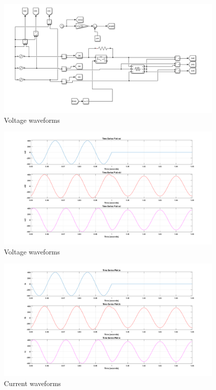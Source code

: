 \documentclass{article}
\begin{document}
\begin{figure}[h!]
\centering
\includegraphics[scale=0.35]{Figures/ResistiveLoad/Model.PNG}
\caption{Voltage waveforms }
\label{fig:ModelResistive}
\end{figure}

\begin{figure}[h!]
\centering
\includegraphics[scale=0.35]{Figures/ResistiveLoad/Vabc.png}
\caption{Voltage waveforms }
\label{fig:ResistiveLoad_Vabc}
\end{figure}

\begin{figure}[h!]
\centering
\includegraphics[scale=0.35]{Figures/ResistiveLoad/Iabc.png}
\caption{Current waveforms}
\label{fig:ResistiveLoad_Iabc}
\end{figure}
\end{document}
